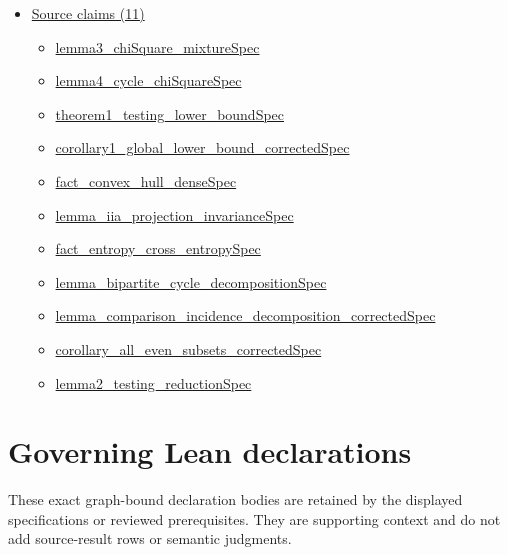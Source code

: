 \documentclass[10pt]{article}
\begin{document}
\begin{itemize}[leftmargin=1.2em]
\begin{itemize}[leftmargin=1.2em]
\end{itemize}
\item \hyperlink{source-section-f10b5f68e4acf3dc}{Source claims (11)}
\begin{itemize}[leftmargin=1.2em]
\item \hyperlink{source-claim-170f4034c89e0c5a}{lemma3\_\allowbreak{}chi\allowbreak{}Square\_\allowbreak{}mixture\allowbreak{}Spec}
\item \hyperlink{source-claim-9633f918d553c054}{lemma4\_\allowbreak{}cycle\_\allowbreak{}chi\allowbreak{}Square\allowbreak{}Spec}
\item \hyperlink{source-claim-0b1799dc95e4cecd}{theorem1\_\allowbreak{}testing\_\allowbreak{}lower\_\allowbreak{}bound\allowbreak{}Spec}
\item \hyperlink{source-claim-cfe27cf1054f4fbd}{corollary1\_\allowbreak{}global\_\allowbreak{}lower\_\allowbreak{}bound\_\allowbreak{}corrected\allowbreak{}Spec}
\item \hyperlink{source-claim-897ddf3255efb3ee}{fact\_\allowbreak{}convex\_\allowbreak{}hull\_\allowbreak{}dense\allowbreak{}Spec}
\item \hyperlink{source-claim-79ec8422021db9ff}{lemma\_\allowbreak{}iia\_\allowbreak{}projection\_\allowbreak{}invariance\allowbreak{}Spec}
\item \hyperlink{source-claim-51e7083c7665542f}{fact\_\allowbreak{}entropy\_\allowbreak{}cross\_\allowbreak{}entropy\allowbreak{}Spec}
\item \hyperlink{source-claim-a54c3d0e5ebe4426}{lemma\_\allowbreak{}bipartite\_\allowbreak{}cycle\_\allowbreak{}decomposition\allowbreak{}Spec}
\item \hyperlink{source-claim-210099b0ca9e6006}{lemma\_\allowbreak{}comparison\_\allowbreak{}incidence\_\allowbreak{}decomposition\_\allowbreak{}corrected\allowbreak{}Spec}
\item \hyperlink{source-claim-8bbf68e52109432f}{corollary\_\allowbreak{}all\_\allowbreak{}even\_\allowbreak{}subsets\_\allowbreak{}corrected\allowbreak{}Spec}
\item \hyperlink{source-claim-c2aa7e7aff10bcc2}{lemma2\_\allowbreak{}testing\_\allowbreak{}reduction\allowbreak{}Spec}
\end{itemize}
\end{itemize}

\clearpage
\hypertarget{governing-declaration-section-5ef5ef0364b6939c}{}
\section*{Governing Lean declarations}
These exact graph-bound declaration bodies are retained by the displayed specifications or reviewed prerequisites. They are supporting context and do not add source-result rows or semantic judgments.
\hypertarget{governing-declaration-41f5067b39e8924b}{}
\end{document}
